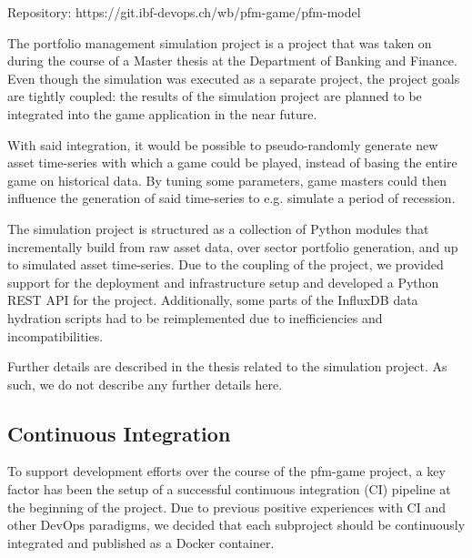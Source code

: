 Repository: https://git.ibf-devops.ch/wb/pfm-game/pfm-model

The portfolio management simulation project is a project that was taken on during the course of a Master thesis at the Department of Banking and Finance. Even though the simulation was executed as a separate project, the project goals are tightly coupled: the results of the simulation project are planned to be integrated into the game application in the near future.

With said integration, it would be possible to pseudo-randomly generate new asset time-series with which a game could be played, instead of basing the entire game on historical data. By tuning some parameters, game masters could then influence the generation of said time-series to e.g. simulate a period of recession.

The simulation project is structured as a collection of Python modules that incrementally build from raw asset data, over sector portfolio generation, and up to simulated asset time-series. Due to the coupling of the project, we provided support for the deployment and infrastructure setup and developed a Python REST API for the project. Additionally, some parts of the InfluxDB data hydration scripts had to be reimplemented due to inefficiencies and incompatibilities.

Further details are described in the thesis related to the simulation project. As such, we do not describe any further details here.


\subsection{Continuous Integration}

To support development efforts over the course of the pfm-game project, a key factor has been the setup of a successful continuous integration (CI) pipeline at the beginning of the project. Due to previous positive experiences with CI and other DevOps paradigms, we decided that each subproject should be continuously integrated and published as a Docker container.